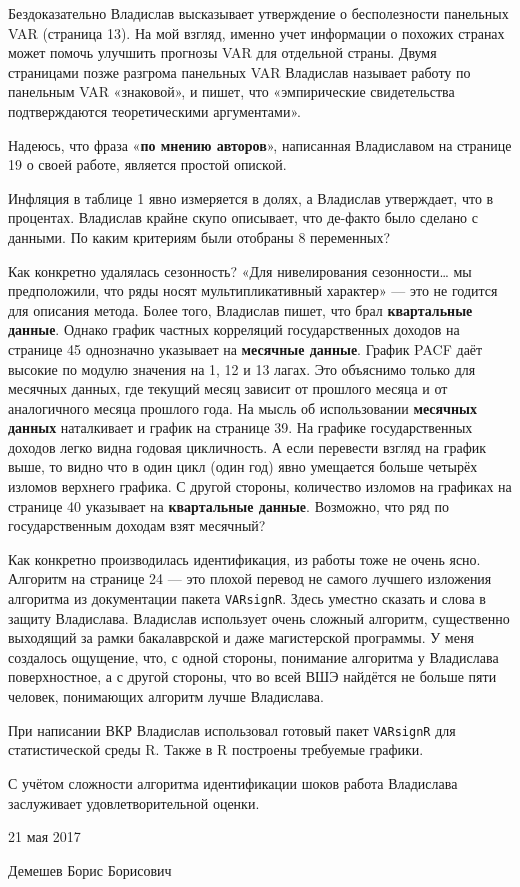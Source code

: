 \documentclass[a4paper, 12pt]{article}
\begin{document}
Бездоказательно Владислав высказывает утверждение о бесполезности
панельных VAR (страница 13). На мой взгляд, именно учет информации о
похожих странах может помочь улучшить прогнозы VAR для отдельной страны.
Двумя страницами позже разгрома панельных VAR Владислав называет работу
по панельным VAR «знаковой», и пишет, что «эмпирические свидетельства
подтверждаются теоретическими аргументами».

Надеюсь, что фраза «\textbf{по мнению авторов}», написанная Владиславом
на странице 19 о своей работе, является простой опиской.

Инфляция в таблице 1 явно измеряется в долях, а Владислав утверждает,
что в процентах. Владислав крайне скупо описывает, что де-факто было
сделано с данными. По каким критериям были отобраны 8 переменных?

Как конкретно удалялась сезонность? «Для нивелирования
сезонности\ldots{} мы предположили, что ряды носят мультипликативный
характер» --- это не годится для описания метода. Более того, Владислав
пишет, что брал \textbf{квартальные данные}. Однако график частных
корреляций государственных доходов на странице 45 однозначно указывает
на \textbf{месячные данные}. График PACF даёт высокие по модулю значения
на 1, 12 и 13 лагах. Это объяснимо только для месячных данных, где
текущий месяц зависит от прошлого месяца и от аналогичного месяца
прошлого года. На мысль об использовании \textbf{месячных данных}
наталкивает и график на странице 39. На графике государственных доходов
легко видна годовая цикличность. А если перевести взгляд на график выше,
то видно что в один цикл (один год) явно умещается больше четырёх
изломов верхнего графика. С другой стороны, количество изломов на
графиках на странице 40 указывает на \textbf{квартальные данные}.
Возможно, что ряд по государственным доходам взят месячный?

Как конкретно производилась идентификация, из работы тоже не очень ясно.
Алгоритм на странице 24 --- это плохой перевод не самого лучшего
изложения алгоритма из документации пакета \texttt{VARsignR}. Здесь
уместно сказать и слова в защиту Владислава. Владислав использует очень
сложный алгоритм, существенно выходящий за рамки бакалаврской и даже
магистерской программы. У меня создалось ощущение, что, с одной стороны,
понимание алгоритма у Владислава поверхностное, а с другой стороны, что
во всей ВШЭ найдётся не больше пяти человек, понимающих алгоритм лучше
Владислава.

При написании ВКР Владислав использовал готовый пакет \texttt{VARsignR}
для статистической среды R. Также в R построены требуемые графики.

С учётом сложности алгоритма идентификации шоков работа Владислава
заслуживает удовлетворительной оценки.

\vspace{0.4cm}

21 мая 2017

Демешев Борис Борисович
\end{document}
